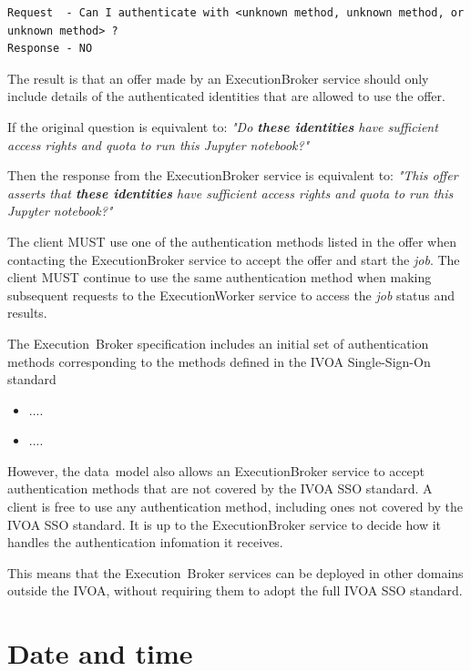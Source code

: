 \documentclass[11pt,a4paper]{ivoa}
\newcommand{\datamodel} {data~model}
\newcommand{\ivoa} {IVOA}
\newcommand{\execbrokerclass} {ExecutionBroker}
\newcommand{\execworkerclass} {ExecutionWorker}
\newcommand{\executionbroker} {Execution~Broker}
\newcommand{\jupyternotebook} {Jupyter notebook}
\newcommand{\job} {\textit{job}}
\begin{document}
\begin{lstlisting}[]
Request  - Can I authenticate with <unknown method, unknown method, or unknown method> ?
Response - NO
\end{lstlisting}

The result is that an offer made by an \execbrokerclass{} service should only include details
of the authenticated identities that are allowed to use the offer.

If the original question is equivalent to:
\textit{"Do \textbf{these identities} have sufficient access rights and quota to run this \jupyternotebook{}?"}

Then the response from the \execbrokerclass{} service is equivalent to:
\textit{"This offer asserts that \textbf{these identities} have sufficient access rights and quota to run this \jupyternotebook{}?"}

The client MUST use one of the authentication methods listed in the offer when
contacting the \execbrokerclass{} service to accept the offer and start the \job{}.
The client MUST continue to use the same authentication method when making subsequent
requests to the \execworkerclass{} service to access the \job{} status and results.

The \executionbroker{} specification includes an initial set of authentication methods
corresponding to the methods defined in the
\ivoa{} Single-Sign-On standard\citep{2017ivoa.spec.0524T}

\begin{itemize}
    \item ....
    \item ....
\end{itemize}

However, the \datamodel{} also allows an \execbrokerclass{} service to accept authentication
methods that are not covered by the \ivoa{} SSO standard.
A client is free to use any authentication method, including ones not covered by the
\ivoa{} SSO standard. It is up to the \execbrokerclass{} service to decide how it
handles the authentication infomation it receives.

This means that the \executionbroker{} services can be deployed in other domains outside the \ivoa{},
without requiring them to adopt the full \ivoa{} SSO standard.

\section{Date and time}
\label{date-time}
\end{document}
